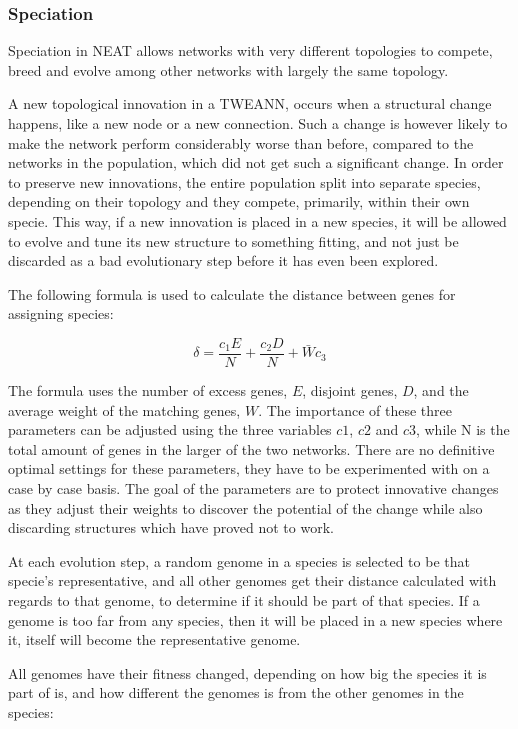 \subsubsection{Speciation}
Speciation in NEAT allows networks with very different topologies to compete, breed and evolve among other networks with largely the same topology.

A new topological innovation in a TWEANN, occurs when a structural change happens, like a new node or a new connection. Such a change is however likely to make the network perform considerably worse than before, compared to the networks in the population, which did not get such a significant change. In order to preserve new innovations, the entire population split into separate species, depending on their topology and they compete, primarily, within their own specie. This way, if a new innovation is placed in a new species, it will be allowed to evolve and tune its new structure to something fitting, and not just be discarded as a bad evolutionary step before it has even been explored.

The following formula is used to calculate the distance between genes for assigning species: 

$$\delta = \frac{c_1E}{N} + \frac{c_2D}{N} + \bar W c_3$$

The formula uses the number of excess genes, $E$, disjoint genes, $D$, and the average weight of the matching genes, $W$. The importance of these three parameters can be adjusted using the three variables $c1$, $c2$ and $c3$, while N is the total amount of genes in the larger of the two networks. There are no definitive optimal settings for these parameters, they have to be experimented with on a case by case basis. The goal of the parameters are to protect innovative changes as they adjust their weights to discover the potential of the change while also discarding structures which have proved not to work.

At each evolution step, a random genome in a species is selected to be that specie's representative, and all other genomes get their distance calculated with regards to that genome, to determine if it should be part of that species. If a genome is too far from any species, then it will be placed in a new species where it, itself will become the representative genome.

All genomes have their fitness changed, depending on how big the species it is part of is, and how different the genomes is from the other genomes in the species:

